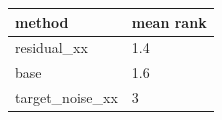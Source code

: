 \begin{tabular}{ll}
\toprule
method & mean rank \\
\midrule
residual\_xx & 1.4 \\
base & 1.6 \\
target\_noise\_xx & 3 \\
\bottomrule
\end{tabular}
